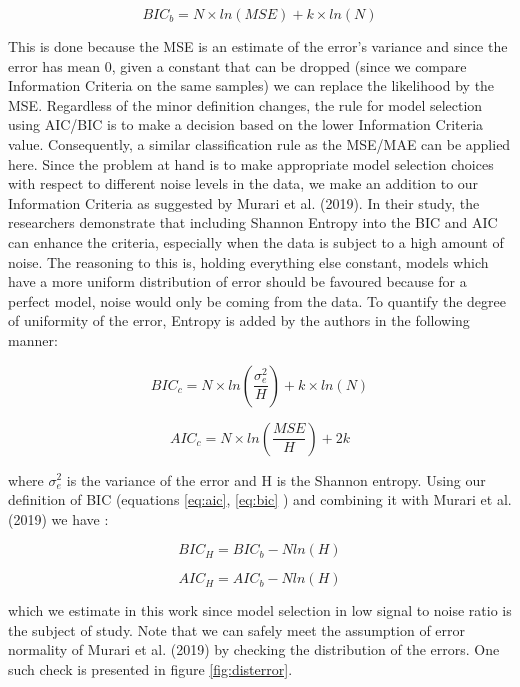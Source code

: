 \documentclass[12pt,]{article}
\begin{document}
\begin{equation}
BIC_b = N \times ln(MSE) + k\times ln(N) \label{eq:bic}
\end{equation}

This is done because the MSE is an estimate of the error's variance and since the error has mean 0, given a constant that can be dropped (since we compare Information Criteria on the same samples) we can replace the likelihood by the MSE. Regardless of the minor definition changes, the rule for model selection using AIC/BIC is to make a decision based on the lower Information Criteria value. Consequently, a similar classification rule as the MSE/MAE can be applied here. Since the problem at hand is to make appropriate model selection choices with respect to different noise levels in the data, we make an addition to our Information Criteria as suggested by Murari et al. (2019). In their study, the researchers demonstrate that including Shannon Entropy into the BIC and AIC can enhance the criteria, especially when the data is subject to a high amount of noise. The reasoning to this is, holding everything else constant, models which have a more uniform distribution of error should be favoured because for a perfect model, noise would only be coming from the data. To quantify the degree of uniformity of the error, Entropy is added by the authors in the following manner:

\begin{equation}
BIC_c = N \times ln(\frac {\sigma_e^2}{H}) + k \times ln(N)
\end{equation}

\begin{equation}
AIC_c = N \times ln(\frac {MSE}{H}) + 2k
\end{equation}

where \(\sigma_e^2\) is the variance of the error and H is the Shannon entropy. Using our definition of BIC (equations \eqref{eq:aic}, \eqref{eq:bic} ) and combining it with Murari et al. (2019) we have :

\begin{equation}
BIC_H = BIC_b - Nln(H)
\end{equation}

\begin{equation}
AIC_H = AIC_b - Nln(H)
\end{equation}

which we estimate in this work since model selection in low signal to noise ratio is the subject of study. Note that we can safely meet the assumption of error normality of Murari et al. (2019) by checking the distribution of the errors. One such check is presented in figure \ref{fig:disterror}.
\end{document}
